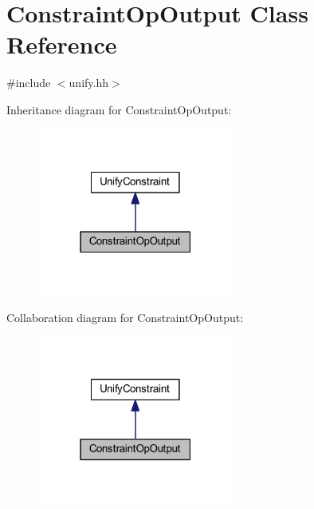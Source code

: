 \hypertarget{class_constraint_op_output}{}\section{Constraint\+Op\+Output Class Reference}
\label{class_constraint_op_output}


{\ttfamily \#include $<$unify.\+hh$>$}



Inheritance diagram for Constraint\+Op\+Output\+:
\nopagebreak
\begin{figure}[H]
\begin{center}
\leavevmode
\includegraphics[width=183pt]{class_constraint_op_output__inherit__graph}
\end{center}
\end{figure}


Collaboration diagram for Constraint\+Op\+Output\+:
\nopagebreak
\begin{figure}[H]
\begin{center}
\leavevmode
\includegraphics[width=183pt]{class_constraint_op_output__coll__graph}
\end{center}
\end{figure}
